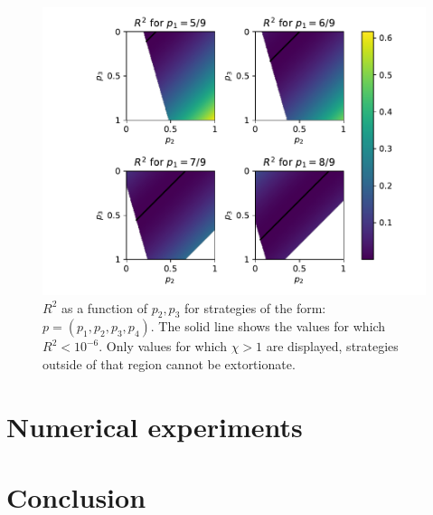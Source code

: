 \documentclass[a4paper]{article}
\begin{document}
\begin{figure}[!htbp]
    \begin{center}
    \includegraphics[width=.6\textwidth]{assets/img/examples_of_extortion/main.pdf}
    \caption{\(R^2\) as a function of \(p_2, p_3\) for strategies of the form:
    \(p=(p_1, p_2, p_3, p_4)\). The solid line shows the values for which \(R^2
    < 10 ^ {-6}\). Only values for which \(\chi > 1\) are displayed, strategies
    outside of that region cannot be extortionate.}
    \label{fig:examples_of_extortion}
    \end{center}
\end{figure}


\section{Numerical experiments}\label{sec:numerical-experiments}



\section{Conclusion}\label{sec:conclusion}


\printbibliography
\end{document}
